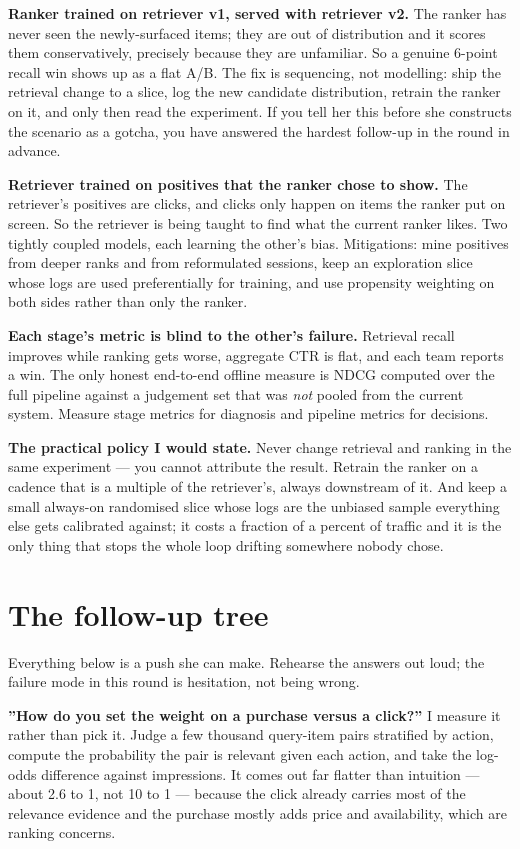 \documentclass[10pt,twoside]{book}
\newcommand{\cchapter}[1]{\chapter{#1}}
\newcommand{\csection}[1]{\par\vspace{13pt}\noindent{\sffamily\large\bfseries\color{ink}\raggedright #1\par}\vspace{4pt}}
\begin{document}
\textbf{Ranker trained on retriever v1, served with retriever v2.} The ranker has never seen the newly-surfaced items; they are out of distribution and it scores them conservatively, precisely because they are unfamiliar. So a genuine 6-point recall win shows up as a flat A/B. The fix is sequencing, not modelling: ship the retrieval change to a slice, log the new candidate distribution, retrain the ranker on it, and only then read the experiment. If you tell her this before she constructs the scenario as a gotcha, you have answered the hardest follow-up in the round in advance.\par
\textbf{Retriever trained on positives that the ranker chose to show.} The retriever's positives are clicks, and clicks only happen on items the ranker put on screen. So the retriever is being taught to find what the current ranker likes. Two tightly coupled models, each learning the other's bias. Mitigations: mine positives from deeper ranks and from reformulated sessions, keep an exploration slice whose logs are used preferentially for training, and use propensity weighting on both sides rather than only the ranker.\par
\textbf{Each stage's metric is blind to the other's failure.} Retrieval recall improves while ranking gets worse, aggregate CTR is flat, and each team reports a win. The only honest end-to-end offline measure is NDCG computed over the full pipeline against a judgement set that was \textit{not} pooled from the current system. Measure stage metrics for diagnosis and pipeline metrics for decisions.\par
\textbf{The practical policy I would state.} Never change retrieval and ranking in the same experiment --- you cannot attribute the result. Retrain the ranker on a cadence that is a multiple of the retriever's, always downstream of it. And keep a small always-on randomised slice whose logs are the unbiased sample everything else gets calibrated against; it costs a fraction of a percent of traffic and it is the only thing that stops the whole loop drifting somewhere nobody chose.\par
\cchapter{The follow-up tree}
Everything below is a push she can make. Rehearse the answers out loud; the failure mode in this round is hesitation, not being wrong.\par
\csection{On retrieval training}
\textbf{''How do you set the weight on a purchase versus a click?''} I measure it rather than pick it. Judge a few thousand query-item pairs stratified by action, compute the probability the pair is relevant given each action, and take the log-odds difference against impressions. It comes out far flatter than intuition --- about 2.6 to 1, not 10 to 1 --- because the click already carries most of the relevance evidence and the purchase mostly adds price and availability, which are ranking concerns.\par
\end{document}
